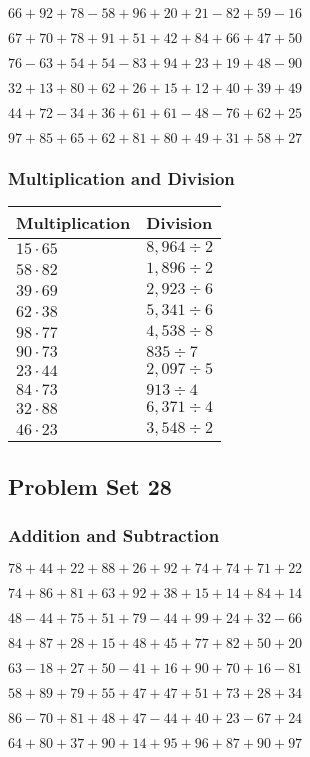 \(66+92+78-58+96+20+21-82+59-16\)

\(67+70+78+91+51+42+84+66+47+50\)

\(76-63+54+54-83+94+23+19+48-90\)

\(32+13+80+62+26+15+12+40+39+49\)

\(44+72-34+36+61+61-48-76+62+25\)

\(97+85+65+62+81+80+49+31+58+27\)

\hypertarget{multiplication-and-division-67}{%
\subsubsection{Multiplication and
Division}\label{multiplication-and-division-67}}

\begin{longtable}[]{@{}ll@{}}
\toprule
Multiplication & Division\tabularnewline
\midrule
\endhead
\(15\cdot65\) & \(8,964÷2\)\tabularnewline
\(58\cdot82\) & \(1,896÷2\)\tabularnewline
\(39\cdot69\) & \(2,923÷6\)\tabularnewline
\(62\cdot38\) & \(5,341÷6\)\tabularnewline
\(98\cdot77\) & \(4,538÷8\)\tabularnewline
\(90\cdot73\) & \(835÷7\)\tabularnewline
\(23\cdot44\) & \(2,097÷5\)\tabularnewline
\(84\cdot73\) & \(913÷4\)\tabularnewline
\(32\cdot88\) & \(6,371÷4\)\tabularnewline
\(46\cdot23\) & \(3,548÷2\)\tabularnewline
\bottomrule
\end{longtable}

\hypertarget{problem-set-28-1}{%
\subsection{Problem Set 28}\label{problem-set-28-1}}

\hypertarget{addition-and-subtraction-68}{%
\subsubsection{Addition and
Subtraction}\label{addition-and-subtraction-68}}

\(78+44+22+88+26+92+74+74+71+ 22\)

\(74+86+81+63+92+38+15+14+84+14\)

\(48-44+75+51+79-44+99+24+32-66\)

\(84+87+28+15+48+45+77+82+50+20\)

\(63-18+27+50-41+16+90+70+16-81\)

\(58+89+79+55+47+47+51+73+28+34\)

\(86-70+81+48+47-44+40+23-67+24\)

\(64+80+37+90+14+95+96+87+90+97\)

